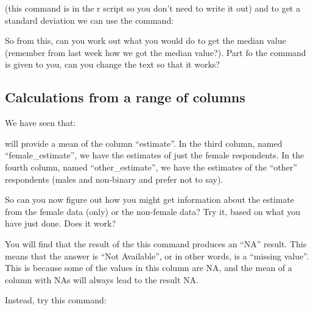 \documentclass[
]{book}
\newenvironment{Shaded}{\begin{snugshade}}{\end{snugshade}}
\newcommand{\AttributeTok}[1]{\textcolor[rgb]{0.77,0.63,0.00}{#1}}
\newcommand{\ConstantTok}[1]{\textcolor[rgb]{0.00,0.00,0.00}{#1}}
\newcommand{\FunctionTok}[1]{\textcolor[rgb]{0.00,0.00,0.00}{#1}}
\newcommand{\NormalTok}[1]{#1}
\newcommand{\SpecialCharTok}[1]{\textcolor[rgb]{0.00,0.00,0.00}{#1}}
\begin{document}
(this command is in the r script so you don't need to write it out) and to get a standard deviation we can use the command:

\begin{Shaded}
\end{Shaded}

So from this, can you work out what you would do to get the median value (remember from last week how we got the median value?). Part fo the command is given to you, can you change the text so that it works?

\hypertarget{calculations-from-a-range-of-columns}{%
\subsection{Calculations from a range of columns}\label{calculations-from-a-range-of-columns}}

We have seen that:

\begin{Shaded}
\end{Shaded}

will provide a mean of the column ``estimate''. In the third column, named ``female\_estimate'', we have the estimates of just the female respondents. In the fourth column, named ``other\_estimate'', we have the estimates of the ``other'' respondents (males and non-binary and prefer not to say).

So can you now figure out how you might get information about the estimate from the female data (only) or the non-female data? Try it, based on what you have just done. Does it work?

You will find that the result of the this command produces an ``NA'' result. This means that the answer is ``Not Available'', or in other words, is a ``missing value''. This is because some of the values in this column are NA, and the mean of a column with NAs will always lead to the result NA.

Instead, try this command:

\begin{Shaded}
\end{Shaded}
\end{document}
